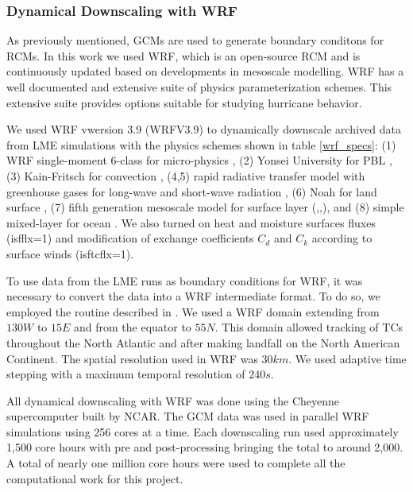 \documentclass[smallextended]{svjour3}       %
\begin{document}
\subsubsection{Dynamical Downscaling with WRF}
\label{WRF}
As previously mentioned, GCMs are used to generate boundary conditons for RCMs. In this work we used WRF, which is an open-source RCM and is continuously updated based on developments in mesoscale modelling. WRF has a well documented and extensive suite of physics parameterization schemes. This extensive suite provides options suitable for studying hurricane behavior. 
\par
We used WRF vwersion 3.9 (WRFV3.9) \cite{wrf_tech} to dynamically downscale archived data from LME simulations with the physics schemes shown in table \ref{wrf_specs}: (1) WRF single-moment 6-class for micro-physics \cite{mp_phys}, (2) Yonsei University for PBL \cite{pbl_phys}, (3) Kain-Fritsch for convection \cite{cu_phys}, (4,5) rapid radiative transfer model with greenhouse gases for long-wave and short-wave radiation \cite{rad_phys}, (6) Noah for land surface \cite{sfc_phys}, (7) fifth generation mesoscale model for surface layer (\cite{sfclay_phys:1},\cite{sfclay_phys:2},\cite{sfclay_phys:3}), and (8) simple mixed-layer for ocean \cite{ocn_phys}. We also turned on heat and moisture surfaces fluxes (isfflx=1) and modification of exchange coefficients $C_d$ and $C_k$ according to surface winds (isftcflx=1). 
\par
To use data from the LME runs as boundary conditions for WRF, it was necessary to convert the data into a WRF intermediate format. To do so, we employed the routine described in \cite{tech_notes}. We used a WRF domain extending from $130W$ to $15E$ and from the equator to $55N$. This domain allowed tracking of TCs throughout the North Atlantic and after making landfall on the North American Continent. The spatial resolution used in WRF was $30km$. We used adaptive time stepping with a maximum temporal resolution of $240s$.
\par
All dynamical downscaling with WRF was done using the Cheyenne supercomputer built by NCAR. The GCM data was used in parallel WRF simulations using 256 cores at a time. Each downscaling run used approximately 1,500 core hours with pre and post-processing bringing the total to around 2,000. A total of nearly one million core hours were used to complete all the computational work for this project.  
\end{document}

